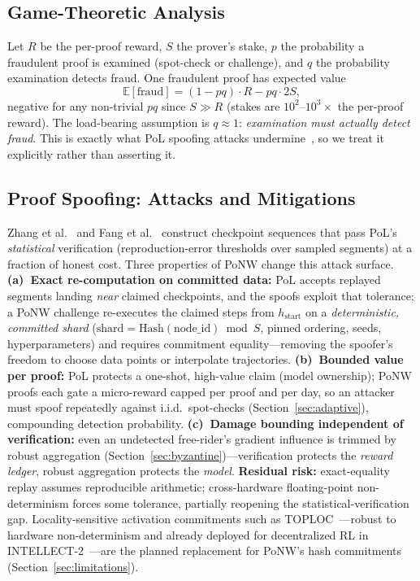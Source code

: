 \documentclass[conference]{IEEEtran}
\begin{document}
\subsection{Game-Theoretic Analysis}
\label{sec:game}

Let $R$ be the per-proof reward, $S$ the prover's stake, $p$ the probability a fraudulent proof is examined (spot-check or challenge), and $q$ the probability examination detects fraud. One fraudulent proof has expected value
\begin{equation}
\mathbb{E}[\text{fraud}] = (1 - pq) \cdot R - pq \cdot 2S, \label{eq:ev}
\end{equation}
negative for any non-trivial $pq$ since $S \gg R$ (stakes are $10^2$--$10^3\times$ the per-proof reward). The load-bearing assumption is $q \approx 1$: \emph{examination must actually detect fraud}. This is exactly what PoL spoofing attacks undermine~\cite{zhang2022adversarial,fang2023proof}, so we treat it explicitly rather than asserting it.

\subsection{Proof Spoofing: Attacks and Mitigations}
\label{sec:ponw-spoofing}

Zhang et al.~\cite{zhang2022adversarial} and Fang et al.~\cite{fang2023proof} construct checkpoint sequences that pass PoL's \emph{statistical} verification (reproduction-error thresholds over sampled segments) at a fraction of honest cost. Three properties of PoNW change this attack surface. \textbf{(a)~Exact re-computation on committed data:} PoL accepts replayed segments landing \emph{near} claimed checkpoints, and the spoofs exploit that tolerance; a PoNW challenge re-executes the claimed steps from $h_{\text{start}}$ on a \emph{deterministic, committed shard} ($\text{shard} = \text{Hash}(\text{node\_id}) \bmod S$, pinned ordering, seeds, hyperparameters) and requires commitment equality---removing the spoofer's freedom to choose data points or interpolate trajectories. \textbf{(b)~Bounded value per proof:} PoL protects a one-shot, high-value claim (model ownership); PoNW proofs each gate a micro-reward capped per proof and per day, so an attacker must spoof repeatedly against i.i.d.\ spot-checks (Section~\ref{sec:adaptive}), compounding detection probability. \textbf{(c)~Damage bounding independent of verification:} even an undetected free-rider's gradient influence is trimmed by robust aggregation (Section~\ref{sec:byzantine})---verification protects the \emph{reward ledger}, robust aggregation protects the \emph{model}. \textbf{Residual risk:} exact-equality replay assumes reproducible arithmetic; cross-hardware floating-point non-determinism forces some tolerance, partially reopening the statistical-verification gap. Locality-sensitive activation commitments such as TOPLOC~\cite{ong2025toploc}---robust to hardware non-determinism and already deployed for decentralized RL in INTELLECT-2~\cite{primeintellect2025intellect2}---are the planned replacement for PoNW's hash commitments (Section~\ref{sec:limitations}).
\end{document}
